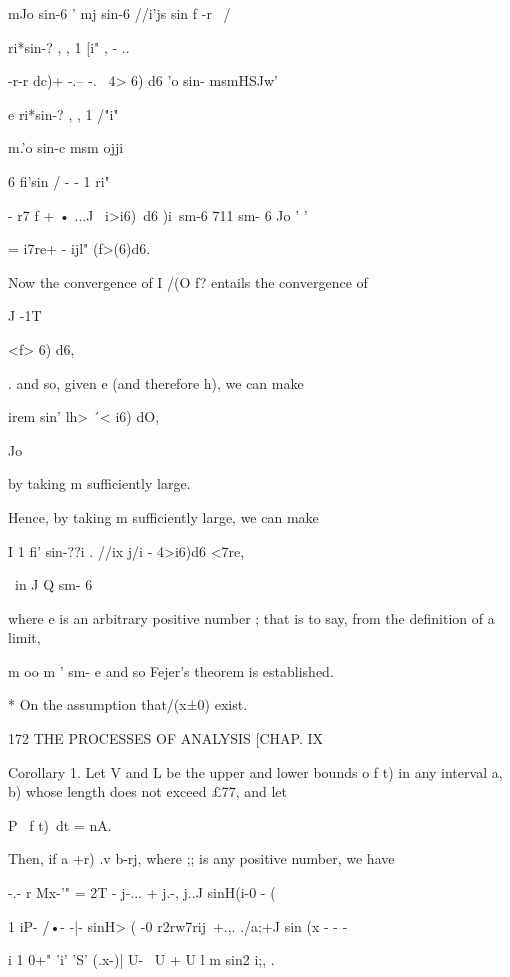 mJo sin-6   ' mj  sin-6   //i'js sin f  -r \ / 

ri*sin-?   , , 1 [i" , -  .. 

-r-r dc)+ -.-- -.  \ 4> 6) d6 
'o sin-  msmHSJw'  



e ri*sin-?   , , 1 /"i" 

m.'o sin-c  msm ojji 

6 fi'sin /  - - 1 ri" 



 -  r7 f + • ...J \ i>i6)\ d6 
 )i\ sm-6 711 sm-  6 Jo '  ' 

= i7re+ - ijl" (f>(6)d6. 



Now the convergence of I /(O f?  entails the convergence of 

J -1T 



<f> 6) d6, 

. 
and so, given e (and therefore h), we can make 

 irem sin' lh> \'\ <  i6) dO, 

Jo 

by taking m sufficiently large. 

Hence, by taking m sufficiently large, we can make 

I 1 fi'  sin-??i  . //ix j/i 
-   4>i6)d6 <7re, 

\ in J Q sm- 6   

where e is an arbitrary positive number ; that is to say, from the definition of 
a limit, 

m oo m ' sm- e 
and so Fejer's theorem is established. 

* On the assumption that/(x±0) exist. 



172 THE PROCESSES OF ANALYSIS [CHAP. IX 

Corollary 1. Let V and L be the upper and lower bounds o f t) in any interval  a, b) 
whose length does not exceed £77, and let 

P \ f t)\ dt = nA. 

Then, if a +r)  .v b-rj, where ;; is any positive number, we have 

 -.- r Mx-'"  = 2T -  j-... + j.-, j..J sinH(i-0 - (    

  1 iP-  /•- -|- sinH> ( -0 
r2rw7rij\  +.,. ./a;+J sin  (x -   - -  

i 1 0+" 'i' 'S'  (.x-)|  U-  \ U  + U l m sin2 i;, . 



